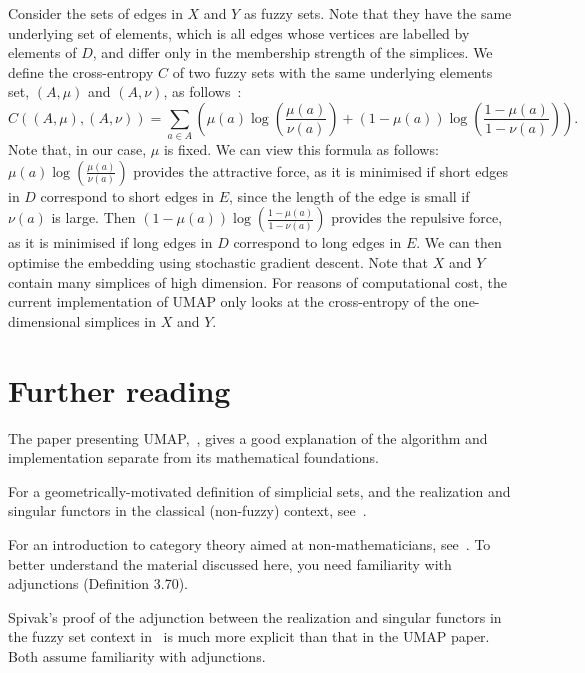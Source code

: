 \documentclass[a4paper,11pt,leqno]{article}
\theoremstyle{definition}
\begin{document}
Consider the sets of edges in $X$ and $Y$ as fuzzy sets.
Note that they have the same underlying set of elements, which is all edges whose vertices are labelled by elements of $D$, and differ only in the membership strength of the simplices.
We define the cross-entropy $C$ of two fuzzy sets with the same underlying elements set, $(A, \mu)$ and $(A, \nu)$, as follows~\cite[Definition 10]{McInnes18}:
$$C((A, \mu), (A, \nu)) = \sum_{a\in A}\left(\mu(a)\log\left(\frac{\mu(a)}{\nu(a)}\right) + (1-\mu(a))\log\left(\frac{1-\mu(a)}{1-\nu(a)}\right)\right).$$
Note that, in our case, $\mu$ is fixed. We can view this formula as follows: $\mu(a)\log\left(\frac{\mu(a)}{\nu(a)}\right)$ provides the attractive force, as it is minimised if short edges in $D$ correspond to short edges in $E$, since the length of the edge is small if $\nu(a)$ is large.
Then $(1-\mu(a))\log\left(\frac{1-\mu(a)}{1-\nu(a)}\right)$ provides the repulsive force, as it is minimised if long edges in $D$ correspond to long edges in $E$.
We can then optimise the embedding using stochastic gradient descent.
Note that $X$ and $Y$ contain many simplices of high dimension.
For reasons of computational cost, the current implementation of UMAP only looks at the cross-entropy of the one-dimensional simplices in $X$ and $Y$. 

\section{Further reading}

The paper presenting UMAP,~\cite{McInnes18}, gives a good explanation of the algorithm and implementation separate from its mathematical foundations.

For a geometrically-motivated definition of simplicial sets, and the realization and singular functors in the classical (non-fuzzy) context, see~\cite{Friedman08}.

For an introduction to category theory aimed at non-mathematicians, see~\cite{Spivak18}. To better understand the material discussed here, you need familiarity with adjunctions (Definition 3.70).

Spivak's proof of the adjunction between the realization and singular functors in the fuzzy set context in~\cite{Spivak} is much more explicit than that in the UMAP paper. Both assume familiarity with adjunctions.
\end{document}
